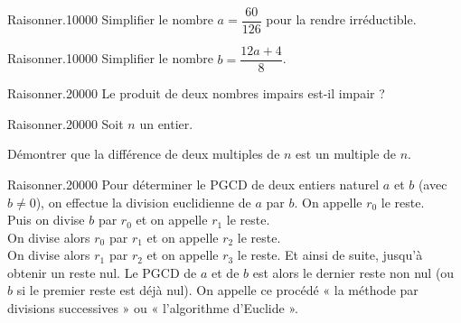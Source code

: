 \begin{pageAuto} 

 
\begin{ExoAutoN}{Raisonner.}{1}{0}{0}{0}{0}
Simplifier le nombre $a=\dfrac{60}{126}$ pour la rendre irréductible. 
\end{ExoAutoN}
\begin{ExoAutoN}{Raisonner.}{1}{0}{0}{0}{0}
Simplifier le nombre $b=\dfrac{12a+4}{8}$. 
\end{ExoAutoN}
\begin{ExoAutoN}{Raisonner.}{2}{0}{0}{0}{0}
Le produit de deux nombres impairs est-il impair ? 
\end{ExoAutoN}


\begin{ExoAutoN}{Raisonner.}{2}{0}{0}{0}{0}
Soit $n$ un entier.

Démontrer que la différence de deux multiples de $n$ est un multiple de $n$. 
\end{ExoAutoN}

\begin{ExoAutoN}{Raisonner.}{2}{0}{0}{0}{0}
  Pour déterminer le PGCD de deux entiers naturel $a$ et $b$ (avec $b \neq 0$),
  on effectue la division euclidienne de $a$ par $b$. On appelle $r_0$ le reste. \\
Puis on divise $b$ par $r_0$ et on appelle $r_1$ le reste. \\
On divise alors $r_0$ par $r_1$ et on appelle $r_2$ le reste.\\ 
On divise alors $r_1$ par $r_2$ et on appelle $r_3$ le reste. Et ainsi de suite,
jusqu'à obtenir un reste nul. 
Le PGCD de $a$ et de $b$ est alors le dernier reste non nul (ou $b$
si le premier reste est déjà nul).
On appelle ce procédé « la méthode par divisions successives » ou
« l'algorithme d'Euclide ». 

\begin{enumerate}[leftmargin=*]


\end{enumerate}
\end{ExoAutoN}
\end{pageAuto}
